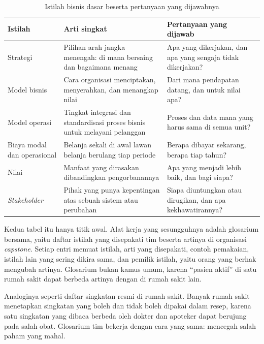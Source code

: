 \begin{table}[!htb]
  \centering
  \caption{Istilah bisnis dasar beserta pertanyaan yang dijawabnya}
  \label{tab:ch01-istilah-bisnis}
  \footnotesize
  \begin{tabularx}{\textwidth}{>{\raggedright\arraybackslash}p{1.8cm}
      >{\raggedright\arraybackslash}X >{\raggedright\arraybackslash}X}
    \hline
    \textbf{Istilah} & \textbf{Arti singkat} & \textbf{Pertanyaan yang dijawab} \\
    \hline
    Strategi & Pilihan arah jangka menengah: di mana bersaing dan bagaimana menang & Apa yang dikerjakan, dan apa yang sengaja tidak dikerjakan? \\
    \hline
    Model bisnis & Cara organisasi menciptakan, menyerahkan, dan menangkap nilai \cite{c01-osterwalder2010} & Dari mana pendapatan datang, dan untuk nilai apa? \\
    \hline
    Model operasi & Tingkat integrasi dan standardisasi proses bisnis untuk melayani pelanggan \cite{ross2006} & Proses dan data mana yang harus sama di semua unit? \\
    \hline
    Biaya modal dan operasional & Belanja sekali di awal lawan belanja berulang tiap periode & Berapa dibayar sekarang, berapa tiap tahun? \\
    \hline
    Nilai & Manfaat yang dirasakan dibandingkan pengorbanannya & Apa yang menjadi lebih baik, dan bagi siapa? \\
    \hline
    \textit{Stakeholder} & Pihak yang punya kepentingan atas sebuah sistem atau perubahan \cite{iso42010} & Siapa diuntungkan atau dirugikan, dan apa kekhawatirannya? \\
    \hline
  \end{tabularx}
\end{table}

Kedua tabel itu hanya titik awal. Alat kerja yang sesungguhnya adalah
glosarium bersama, yaitu daftar istilah yang disepakati tim beserta artinya di
organisasi \textit{capstone}. Setiap entri memuat istilah, arti yang
disepakati, contoh pemakaian, istilah lain yang sering dikira sama, dan
pemilik istilah, yaitu orang yang berhak mengubah artinya. Glosarium bukan
kamus umum, karena ``pasien aktif'' di satu rumah sakit dapat berbeda artinya
dengan di rumah sakit lain.

Analoginya seperti daftar singkatan resmi di rumah sakit. Banyak rumah sakit
menetapkan singkatan yang boleh dan tidak boleh dipakai dalam resep, karena
satu singkatan yang dibaca berbeda oleh dokter dan apoteker dapat berujung
pada salah obat. Glosarium tim bekerja dengan cara yang sama: mencegah salah
paham yang mahal.

